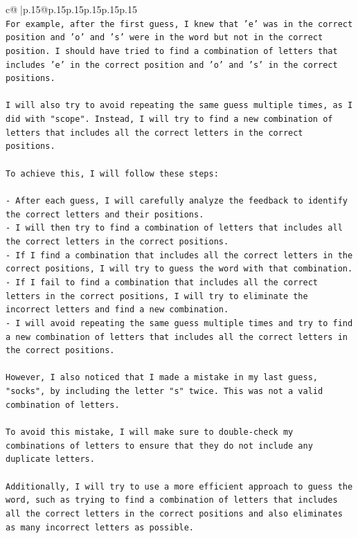 \documentclass{article}
\begin{document}
{\begin{supertabular}{c@{$\;$}|p{.15\linewidth}@{}p{.15\linewidth}p{.15\linewidth}p{.15\linewidth}p{.15\linewidth}p{.15\linewidth}}
{{{\\ 
\texttt{For example, after the first guess, I knew that 'e' was in the correct position and 'o' and 's' were in the word but not in the correct position. I should have tried to find a combination of letters that includes 'e' in the correct position and 'o' and 's' in the correct positions. } \\
\\ 
\texttt{I will also try to avoid repeating the same guess multiple times, as I did with "scope". Instead, I will try to find a new combination of letters that includes all the correct letters in the correct positions. } \\
\\ 
\texttt{To achieve this, I will follow these steps:} \\
\\ 
\texttt{{-} After each guess, I will carefully analyze the feedback to identify the correct letters and their positions.} \\
\texttt{{-} I will then try to find a combination of letters that includes all the correct letters in the correct positions.} \\
\texttt{{-} If I find a combination that includes all the correct letters in the correct positions, I will try to guess the word with that combination.} \\
\texttt{{-} If I fail to find a combination that includes all the correct letters in the correct positions, I will try to eliminate the incorrect letters and find a new combination.} \\
\texttt{{-} I will avoid repeating the same guess multiple times and try to find a new combination of letters that includes all the correct letters in the correct positions.} \\
\\ 
\texttt{However, I also noticed that I made a mistake in my last guess, "socks", by including the letter "s" twice. This was not a valid combination of letters. } \\
\\ 
\texttt{To avoid this mistake, I will make sure to double{-}check my combinations of letters to ensure that they do not include any duplicate letters. } \\
\\ 
\texttt{Additionally, I will try to use a more efficient approach to guess the word, such as trying to find a combination of letters that includes all the correct letters in the correct positions and also eliminates as many incorrect letters as possible. } \\
}}}
\end{supertabular}}
\end{document}
